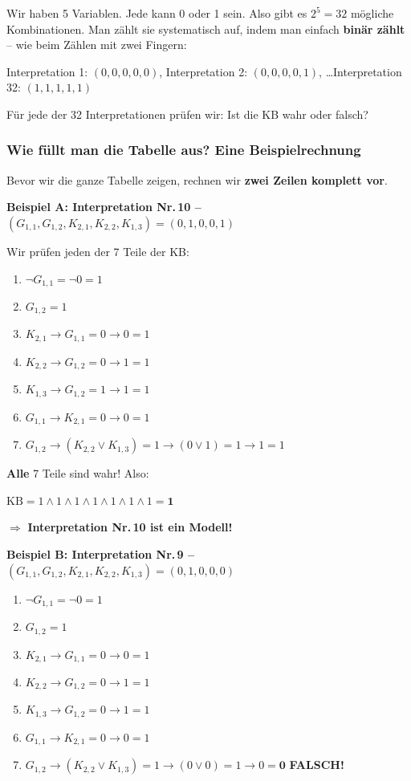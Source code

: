 \documentclass[a4paper,12pt]{article}
\begin{document}
Wir haben 5 Variablen. Jede kann 0 oder 1 sein. Also gibt es $2^5 = 32$ m\"ogliche Kombinationen. Man z\"ahlt sie systematisch auf, indem man einfach \textbf{bin\"ar z\"ahlt} -- wie beim Z\"ahlen mit zwei Fingern:

\begin{center}
\small
Interpretation 1: $(0,0,0,0,0)$, \quad Interpretation 2: $(0,0,0,0,1)$, \quad \ldots \quad Interpretation 32: $(1,1,1,1,1)$
\end{center}

F\"ur jede der 32 Interpretationen pr\"ufen wir: Ist die KB wahr oder falsch?

\subsubsection*{Wie f\"ullt man die Tabelle aus? Eine Beispielrechnung}

Bevor wir die ganze Tabelle zeigen, rechnen wir \textbf{zwei Zeilen komplett vor}.

\bigskip
\textbf{Beispiel A: Interpretation Nr.\,10 -- $(G_{1,1}, G_{1,2}, K_{2,1}, K_{2,2}, K_{1,3}) = (0, 1, 0, 0, 1)$}

Wir pr\"ufen jeden der 7 Teile der KB:

\begin{enumerate}
\item $\neg G_{1,1} = \neg 0 = 1$ \checkmark
\item $G_{1,2} = 1$ \checkmark
\item $K_{2,1} \to G_{1,1} = 0 \to 0 = 1$ \checkmark
\item $K_{2,2} \to G_{1,2} = 0 \to 1 = 1$ \checkmark
\item $K_{1,3} \to G_{1,2} = 1 \to 1 = 1$ \checkmark
\item $G_{1,1} \to K_{2,1} = 0 \to 0 = 1$ \checkmark
\item $G_{1,2} \to (K_{2,2} \vee K_{1,3}) = 1 \to (0 \vee 1) = 1 \to 1 = 1$ \checkmark
\end{enumerate}

\textbf{Alle} 7 Teile sind wahr! Also:

$\text{KB} = 1 \wedge 1 \wedge 1 \wedge 1 \wedge 1 \wedge 1 \wedge 1 = \mathbf{1}$

$\Rightarrow$ \textbf{Interpretation Nr.\,10 ist ein Modell!}

\bigskip
\textbf{Beispiel B: Interpretation Nr.\,9 -- $(G_{1,1}, G_{1,2}, K_{2,1}, K_{2,2}, K_{1,3}) = (0, 1, 0, 0, 0)$}

\begin{enumerate}
\item $\neg G_{1,1} = \neg 0 = 1$ \checkmark
\item $G_{1,2} = 1$ \checkmark
\item $K_{2,1} \to G_{1,1} = 0 \to 0 = 1$ \checkmark
\item $K_{2,2} \to G_{1,2} = 0 \to 1 = 1$ \checkmark
\item $K_{1,3} \to G_{1,2} = 0 \to 1 = 1$ \checkmark
\item $G_{1,1} \to K_{2,1} = 0 \to 0 = 1$ \checkmark
\item $G_{1,2} \to (K_{2,2} \vee K_{1,3}) = 1 \to (0 \vee 0) = 1 \to 0 = \mathbf{0}$ \textbf{FALSCH!}
\end{enumerate}
\end{document}
